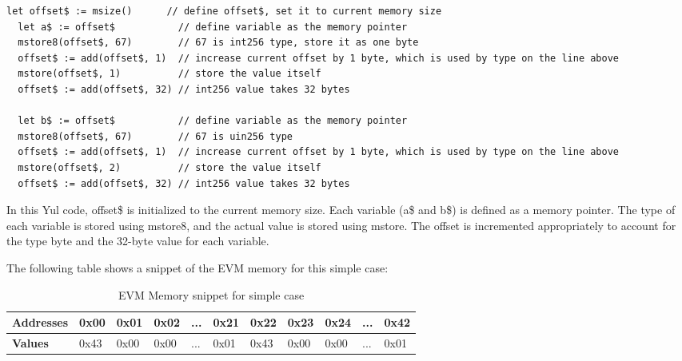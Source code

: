 \begin{lstlisting}[caption={Generated yul code for simple case}, language=yul]
  let offset$ := msize()      // define offset$, set it to current memory size 
  let a$ := offset$           // define variable as the memory pointer
  mstore8(offset$, 67)        // 67 is int256 type, store it as one byte
  offset$ := add(offset$, 1)  // increase current offset by 1 byte, which is used by type on the line above
  mstore(offset$, 1)          // store the value itself
  offset$ := add(offset$, 32) // int256 value takes 32 bytes

  let b$ := offset$           // define variable as the memory pointer
  mstore8(offset$, 67)        // 67 is uin256 type
  offset$ := add(offset$, 1)  // increase current offset by 1 byte, which is used by type on the line above
  mstore(offset$, 2)          // store the value itself
  offset$ := add(offset$, 32) // int256 value takes 32 bytes
\end{lstlisting}

In this Yul code, offset\$ is initialized to the current memory size. Each variable (a\$ and b\$) is defined as a memory pointer. The type of each variable is stored using mstore8, and the actual value is stored using mstore. The offset is incremented appropriately to account for the type byte and the 32-byte value for each variable.

The following table shows a snippet of the EVM memory for this simple case:

\begin{table}[h!]
  \centering
  \renewcommand{\arraystretch}{1.2} %
  \begin{tabular}{|>{\centering\arraybackslash}m{2cm}|>{\centering\arraybackslash}m{1cm}|>{\centering\arraybackslash}m{1cm}|>{\centering\arraybackslash}m{1cm}|>{\centering\arraybackslash}m{0.75cm}|>{\centering\arraybackslash}m{1cm}|>{\centering\arraybackslash}m{1cm}|>{\centering\arraybackslash}m{1cm}|>{\centering\arraybackslash}m{1cm}|>{\centering\arraybackslash}m{0.75cm}|>{\centering\arraybackslash}m{1cm}|}
  \hline
  \textbf{Addresses} & 0x00 & 0x01 & 0x02 & ... & 0x21 & 0x22 & 0x23 & 0x24 & ... & 0x42 \\ \hline
  \textbf{Values}    & 0x43 & 0x00 & 0x00 & ... & 0x01 & 0x43 & 0x00 & 0x00 & ... & 0x01 \\ \hline
  \end{tabular}
  \caption{EVM Memory snippet for simple case}
  \label{tab:evm_memory}
  \end{table}

